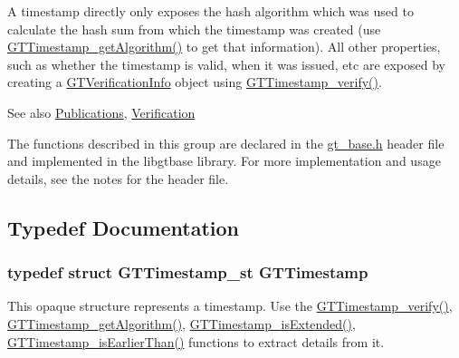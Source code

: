 A timestamp directly only exposes the hash algorithm which was used to calculate the hash sum from which the timestamp was created (use \hyperlink{group__timestamps_ga00fbe27df09c87517479d068afaf11a0}{GTTimestamp\_\-getAlgorithm()} to get that information). All other properties, such as whether the timestamp is valid, when it was issued, etc are exposed by creating a \hyperlink{group__verification_ga54ec3cb4a9e8bdfd7400116440e23b36}{GTVerificationInfo} object using \hyperlink{group__verification_gabb2faaa480064b6aad83582b80aa2c53}{GTTimestamp\_\-verify()}.

\begin{DoxySeeAlso}{See also}
\hyperlink{group__publications}{Publications}, \hyperlink{group__verification}{Verification}
\end{DoxySeeAlso}
The functions described in this group are declared in the {\ttfamily \hyperlink{gt__base_8h}{gt\_\-base.h}} header file and implemented in the {\ttfamily libgtbase} library. For more implementation and usage details, see the notes for the header file. 

\subsection{Typedef Documentation}
\hypertarget{group__timestamps_gaddb792efe52216386853c94e7aeaf6ba}{
\subsubsection[{GTTimestamp}]{\setlength{\rightskip}{0pt plus 5cm}typedef struct GTTimestamp\_\-st {\bf GTTimestamp}}}
\label{group__timestamps_gaddb792efe52216386853c94e7aeaf6ba}
This opaque structure represents a timestamp. Use the \hyperlink{group__verification_gabb2faaa480064b6aad83582b80aa2c53}{GTTimestamp\_\-verify()}, \hyperlink{group__timestamps_ga00fbe27df09c87517479d068afaf11a0}{GTTimestamp\_\-getAlgorithm()}, \hyperlink{group__timestamps_ga4f4d4ffa1ccd17c7bbb290e54806b8c2}{GTTimestamp\_\-isExtended()}, \hyperlink{group__timestamps_gacca559dbe52467feed1df7d0c3aad4fb}{GTTimestamp\_\-isEarlierThan()} functions to extract details from it. 


